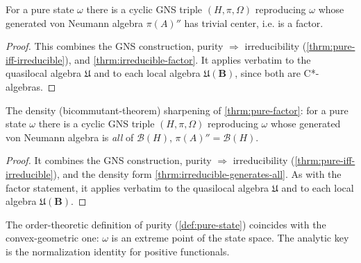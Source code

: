 \begin{theorem}
    \label{thrm:pure-factor}
    \leanok
    For a pure state $\omega$ there is a cyclic GNS triple $(H, \pi, \Omega)$ reproducing $\omega$ whose generated von Neumann algebra $\pi(A)''$ has trivial center, i.e. is a factor.
\end{theorem}
\begin{proof}
    \leanok
    This combines the GNS construction, purity $\Rightarrow$ irreducibility (\ref{thrm:pure-iff-irreducible}), and \ref{thrm:irreducible-factor}. It applies verbatim to the quasilocal algebra $\mathfrak{U}$ and to each local algebra $\mathfrak{U}(\mathbf{B})$, since both are C*-algebras.
\end{proof}

\begin{theorem}
    \label{thrm:pure-generates-all}
    \leanok
    The density (bicommutant-theorem) sharpening of \ref{thrm:pure-factor}: for a pure state $\omega$ there is a cyclic GNS triple $(H, \pi, \Omega)$ reproducing $\omega$ whose generated von Neumann algebra is \emph{all} of $\mathcal{B}(H)$, $\pi(A)'' = \mathcal{B}(H)$.
\end{theorem}
\begin{proof}
    \leanok
    It combines the GNS construction, purity $\Rightarrow$ irreducibility (\ref{thrm:pure-iff-irreducible}), and the density form \ref{thrm:irreducible-generates-all}. As with the factor statement, it applies verbatim to the quasilocal algebra $\mathfrak{U}$ and to each local algebra $\mathfrak{U}(\mathbf{B})$.
\end{proof}

The order-theoretic definition of purity (\ref{def:pure-state}) coincides with the convex-geometric one: $\omega$ is an extreme point of the state space. The analytic key is the normalization identity for positive functionals.

